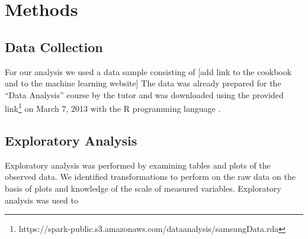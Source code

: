 \documentclass[a4paper,12pt]{extarticle}
\begin{document}




\section{Methods}

\subsection{Data Collection}

For our analysis we used a data sample consisting of 
[add link to the cookbook and to the machine learning website]
The data was already prepared for the ``Data Analysis'' course by the tutor and was downloaded using the provided link\footnote{https://spark-public.s3.amazonaws.com/dataanalysis/samsungData.rda} on March 7, 2013 with the R programming language \cite{source:r-language}.

\subsection{Exploratory Analysis}

Exploratory analysis was performed by examining tables and plots of the observed data. We identified transformations to perform on the raw data on the basis of plots and knowledge of the scale of measured variables. Exploratory analysis was used to
\end{document}
